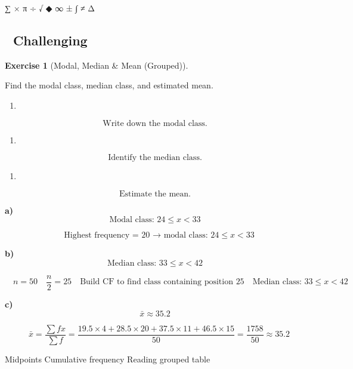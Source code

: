 \documentclass[
  letterpaper,
  DIV=11,
  numbers=noendperiod]{scrreprt}
\providecommand{\tightlist}{%
  \setlength{\itemsep}{0pt}\setlength{\parskip}{0pt}}
\theoremstyle{definition}
\newtheorem{exercise}{Exercise}[chapter]
\theoremstyle{remark}
\begin{document}
∑ × π ÷ √ ◆ ∞ ± ∫ ≠ Δ

\subsection{🔴 Challenging}

\begin{exercise}[Modal, Median \& Mean
(Grouped)]\protect\hypertarget{exr-grp-4}{}\label{exr-grp-4}

Find the modal class, median class, and estimated mean.

\begin{enumerate}
\def\labelenumi{\alph{enumi})}
\tightlist
\item
\end{enumerate}

\[\text{{Write down the modal class.}}\]

\begin{enumerate}
\def\labelenumi{\alph{enumi})}
\setcounter{enumi}{1}
\tightlist
\item
\end{enumerate}

\[\text{{Identify the median class.}}\]

\begin{enumerate}
\def\labelenumi{\alph{enumi})}
\setcounter{enumi}{2}
\tightlist
\item
\end{enumerate}

\[\text{{Estimate the mean.}}\]

\begin{tcolorbox}[enhanced jigsaw, opacitybacktitle=0.6, coltitle=black, arc=.35mm, colframe=quarto-callout-tip-color-frame, colback=white, bottomrule=.15mm, left=2mm, colbacktitle=quarto-callout-tip-color!10!white, titlerule=0mm, opacityback=0, title=\textcolor{quarto-callout-tip-color}{\faLightbulb}\hspace{0.5em}{🔍 View Solution}, leftrule=.75mm, breakable, rightrule=.15mm, bottomtitle=1mm, toptitle=1mm, toprule=.15mm]

\textbf{a)} \[\text{Modal class: }24 \leq x < 33\]

\[\quad \text{Highest frequency = }20\text{ → modal class: }24 \leq x < 33\]

\textbf{b)} \[\text{Median class: }33 \leq x < 42\]

\[\quad n=50\quad \frac{n}{2}=25\quad \text{Build CF to find class containing position }25\quad \text{Median class: }33 \leq x < 42\]

\textbf{c)} \[\bar{x} \approx 35.2\]

\[\quad \bar{x}=\dfrac{\sum fx}{\sum f}=\dfrac{19.5\times4+28.5\times20+37.5\times11+46.5\times15}{50}=\dfrac{1758}{50}\approx35.2\]

\end{tcolorbox}

{Midpoints} {Cumulative frequency} {Reading grouped table}

\end{exercise}
\end{document}
